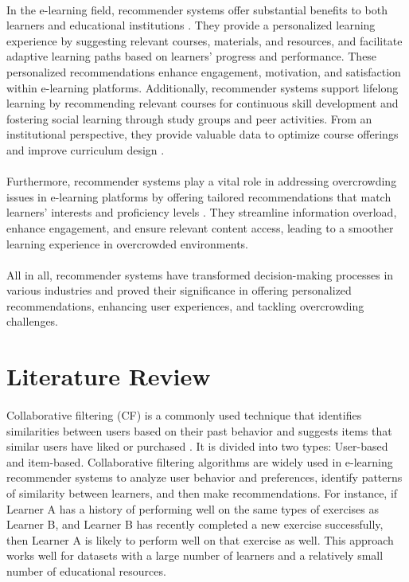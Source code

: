 \documentclass{cup-pan}
\begin{document}
\paragraph{}
In the e-learning field, recommender systems offer substantial benefits to both learners and educational institutions \cite{3}. They provide a personalized learning experience by suggesting relevant courses, materials, and resources, and facilitate adaptive learning paths based on learners' progress and performance. These personalized recommendations enhance engagement, motivation, and satisfaction within e-learning platforms. Additionally, recommender systems support lifelong learning by recommending relevant courses for continuous skill development and fostering social learning through study groups and peer activities. From an institutional perspective, they provide valuable data to optimize course offerings and improve curriculum design \cite{3}.
\paragraph{}
Furthermore, recommender systems play a vital role in addressing overcrowding issues in e-learning platforms by offering tailored recommendations that match learners' interests and proficiency levels \cite{4}. They streamline information overload, enhance engagement, and ensure relevant content access, leading to a smoother learning experience in overcrowded environments.
\paragraph{}
All in all, recommender systems have transformed decision-making processes in various industries and proved their significance in offering personalized recommendations, enhancing user experiences, and tackling overcrowding challenges.

\section{Literature Review}
\label{sec:overview}
\paragraph{}
Collaborative filtering (CF) is a commonly used technique that identifies similarities between users based on their past behavior and suggests items that similar users have liked or purchased \cite{5}. It is divided into two types: User-based and item-based.
Collaborative filtering algorithms are widely used in e-learning recommender systems to analyze user behavior and preferences, identify patterns of similarity between learners, and then make recommendations. For instance, if Learner A has a history of performing well on the same
types of exercises as Learner B, and Learner B has recently completed a new exercise successfully, then Learner A is likely to perform well on that exercise as well. This approach works well for datasets with a large number of learners and a relatively small number of educational resources.
\end{document}
